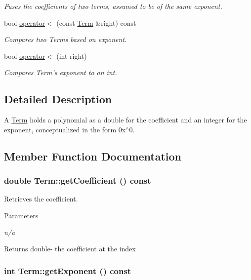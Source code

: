 \begin{DoxyCompactItemize}
\begin{DoxyCompactList}\small\item\em Fuses the coefficients of two terms, assumed to be of the same exponent. \item\end{DoxyCompactList}\item 
bool \hyperlink{classTerm_a34755dc6c3b6084fb864bdad671be087}{operator$<$} (const \hyperlink{classTerm}{Term} \&right) const 
\begin{DoxyCompactList}\small\item\em Compares two Terms based on exponent. \item\end{DoxyCompactList}\item 
bool \hyperlink{classTerm_a44f5d686c50172e689cf86b2c77bbc6a}{operator$<$} (int right)
\begin{DoxyCompactList}\small\item\em Compares Term's exponent to an int. \item\end{DoxyCompactList}\end{DoxyCompactItemize}


\subsection{Detailed Description}
A \hyperlink{classTerm}{Term} holds a polynomial as a double for the coefficient and an integer for the exponent, conceptualized in the form 0x$^\wedge$0. 

\subsection{Member Function Documentation}
\hypertarget{classTerm_a155053b3506f434c6c788deb46b58eca}{
\subsubsection[{getCoefficient}]{\setlength{\rightskip}{0pt plus 5cm}double Term::getCoefficient () const}}
\label{classTerm_a155053b3506f434c6c788deb46b58eca}


Retrieves the coefficient. 
\begin{DoxyParams}{Parameters}
\item[{\em n/a}]\end{DoxyParams}
\begin{DoxyReturn}{Returns}
double-\/ the coefficient at the index 
\end{DoxyReturn}
\hypertarget{classTerm_a4366a4bde58427fde228da9f95505a78}{
\subsubsection[{getExponent}]{\setlength{\rightskip}{0pt plus 5cm}int Term::getExponent () const}}
\label{classTerm_a4366a4bde58427fde228da9f95505a78}


